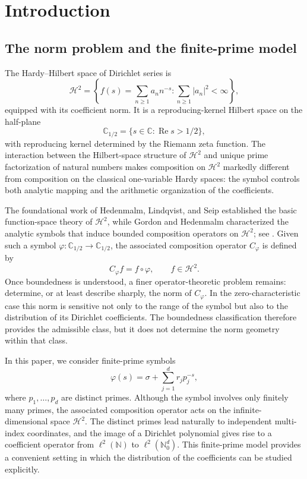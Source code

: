 \documentclass[12pt, reqno]{amsart}
\numberwithin{equation}{section}
\begin{document}
\maketitle
\vspace{-1cm}
\tableofcontents

\section{Introduction}

\subsection{The norm problem and the finite-prime model}

The Hardy--Hilbert space of Dirichlet series is
\[
\mathcal H^2
=
\left\{
f(s)=\sum_{n\geq1}a_n n^{-s}:
\sum_{n\geq1}|a_n|^2<\infty
\right\},
\]
equipped with its coefficient norm. It is a reproducing-kernel Hilbert
space on the half-plane
\[
\mathbb C_{1/2}
=
\{s\in\mathbb C:\operatorname{Re}s>1/2\},
\]
with reproducing kernel determined by the Riemann zeta function. The interaction between the Hilbert-space structure of $\mathcal H^2$
and unique prime factorization of natural numbers makes composition on $\mathcal H^2$
markedly different from composition on the classical one-variable
Hardy spaces: the symbol controls both analytic mapping and the arithmetic
organization of the coefficients.

The foundational work of Hedenmalm, Lindqvist, and Seip established the
basic function-space theory of $\mathcal H^2$, while Gordon and
Hedenmalm characterized the analytic symbols that induce bounded
composition operators on $\mathcal H^2$; see \cite{hls,GH,quef}. Given
such a symbol $\varphi:\mathbb C_{1/2} \to \mathbb C_{1/2}$, the associated composition operator $C_\varphi$ is defined by
\[
C_\varphi f=f\circ\varphi,
\qquad f\in\mathcal H^2.
\]
Once boundedness is understood, a finer
operator-theoretic problem remains: determine, or at least describe
sharply, the norm of $C_\varphi$.  In the zero-characteristic case this norm is sensitive not only to the range of
the symbol but also to the distribution of its Dirichlet coefficients.
The boundedness classification therefore provides the admissible class,
but it does not determine the norm geometry within that class.

In this paper, we consider finite-prime  symbols
\[
\varphi(s)
=
\sigma+\sum_{j=1}^d r_jp_j^{-s},
\]
where $p_1,\ldots,p_d$ are distinct primes. Although the symbol involves only finitely many primes,
the associated composition operator acts on the infinite-dimensional
space $\mathcal H^2$. The distinct primes lead naturally to independent
multi-index coordinates, and the image of a Dirichlet polynomial gives
rise to a coefficient operator from
$\ell^2(\mathbb N)$ to $\ell^2(\mathbb N_0^d)$. This finite-prime model
provides a convenient setting in which the distribution of the
coefficients can be studied explicitly.
\end{document}
